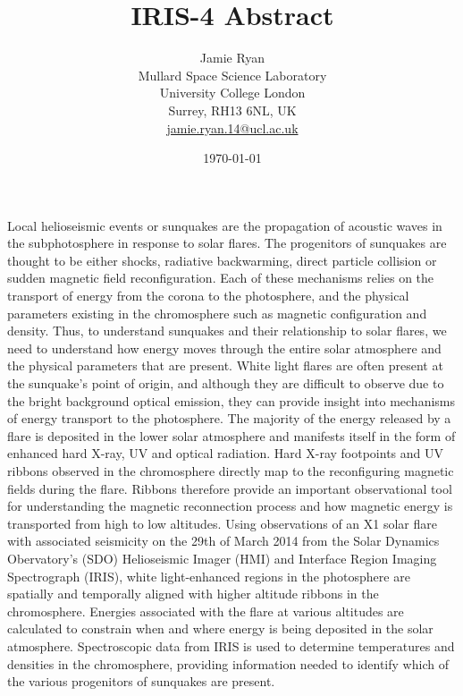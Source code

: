 \documentclass[10pt]{article}
\begin{document}
\title{IRIS-4 Abstract}
\author{Jamie Ryan \\ 
Mullard Space Science Laboratory \\
University College London \\
Surrey, RH13 6NL, UK\\
\href{mailto:jamie.ryan.14@ucl.ac.uk}{jamie.ryan.14@ucl.ac.uk} \\
\date{\today}
}
\maketitle




Local helioseismic events or sunquakes are the propagation of acoustic waves in the subphotosphere in response to solar flares. The progenitors of sunquakes are thought to be either shocks, radiative backwarming, direct particle collision or sudden magnetic field reconfiguration. Each of these mechanisms relies on the transport of energy from the corona to the photosphere, and the physical parameters existing in the chromosphere such as magnetic configuration and density. Thus, to understand sunquakes and their relationship to solar flares, we need to understand how energy moves through the entire solar atmosphere and the physical parameters that are present. White light flares are often present at the sunquake's point of origin, and although they are difficult to observe due to the bright background optical emission, they can provide insight into mechanisms of energy transport to the photosphere. The majority of the energy released by a flare is deposited in the lower solar atmosphere and manifests itself in the form of enhanced hard X-ray, UV and optical radiation. Hard X-ray footpoints and UV ribbons observed in the chromosphere directly map to the reconfiguring magnetic fields during the flare. Ribbons therefore provide an important observational tool for understanding the magnetic reconnection process and how magnetic energy is transported from high to low altitudes. Using observations of an X1 solar flare with associated seismicity on the 29th of March 2014 from the Solar Dynamics Obervatory's (SDO) Helioseismic Imager (HMI) and Interface Region Imaging Spectrograph (IRIS), white light-enhanced regions in the photosphere are spatially and temporally aligned with higher altitude ribbons in the chromosphere. Energies associated with the flare at various altitudes are calculated to constrain when and where energy is being deposited in the solar atmosphere. Spectroscopic data from IRIS is used to determine temperatures and densities in the chromosphere, providing information needed to identify which of the various progenitors of sunquakes are present.         
\end{document}
